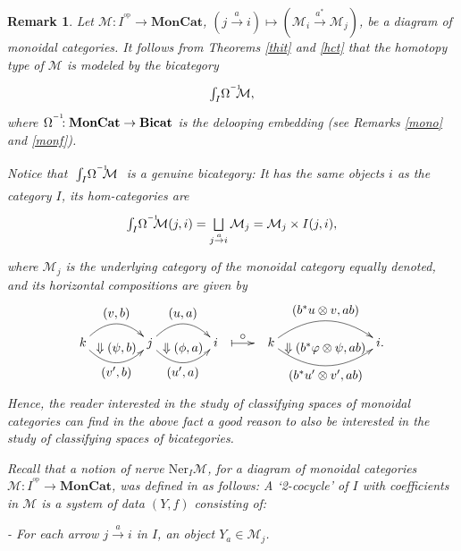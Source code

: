 \documentclass[]{amsart}
\newtheorem{remark}[theorem]{Remark}
\begin{document}
\begin{remark}{\em  Let ${\ensuremath{\mathcal{M}}}: I^{^\mathrm {op}} \to \mathbf{MonCat}$, $(j\overset{a}\to i)\mapsto   ({\ensuremath{\mathcal{M}}}_i\overset{a^*}\to {\ensuremath{\mathcal{M}}}_j)$, be a diagram of monoidal categories. It follows from Theorems \ref{thit} and \ref{hct} that the  homotopy type of ${\ensuremath{\mathcal{M}}}$ is modeled by the bicategory $$\xymatrix{\int_I\!\Omega^{^{-1}}\hspace{-5pt}{\ensuremath{\mathcal{M}}},}$$
where $\Omega^{^{-1}}\hspace{-5pt}:\mathbf{MonCat}\to {\ensuremath{\mathbf{Bicat}}}$ is the delooping embedding (see
Remarks \ref{mono} and \ref{monf}).

Notice that $\xymatrix{\int_I\!\Omega^{^{-1}}\hspace{-5pt}{\ensuremath{\mathcal{M}}}}$ is a genuine bicategory: It has the
same objects $i$ as the category $I$,  its hom-categories are
$$\xymatrix{\int_I\!\Omega^{^{-1}}\hspace{-5pt}{\ensuremath{\mathcal{M}}}(j,i)=\bigsqcup\limits_{j\overset{a}\to i}{\ensuremath{\mathcal{M}}}_j={\ensuremath{\mathcal{M}}}_j\times I(j,i),}$$
where ${\ensuremath{\mathcal{M}}}_j$ is the underlying category of the monoidal category equally denoted, and its
horizontal compositions are given by
$$\xymatrix@C=2pt{k  \ar@/^1.3pc/[rr]^{\textstyle (v,b)} \ar@/_1.3pc/[rr]_{\textstyle (v',b)} & {}_{\textstyle \Downarrow(\psi,b)} &j  \ar@/^1.3pc/[rr]^{\textstyle (u,a)} \ar@/_1.3pc/[rr]_{\textstyle (u',a)} & {}_{\textstyle \Downarrow(\phi,a)} &i&\ar@{|->}[rrr]^-{\textstyle \circ} && &&k \ar@/^1.5pc/[rr]^{\textstyle (b^*u\otimes v,ab)} \ar@/_1.5pc/[rr]_{\textstyle (b^*u'\otimes v',ab)}&{}_{\textstyle \Downarrow(b^*\varphi\otimes\psi,ab)}& i.  }  $$
Hence, the reader interested in the study of classifying spaces of monoidal categories can find in
the above fact a good reason to also be interested in the study of classifying spaces of
bicategories.

\vspace{0.2cm} Recall that a notion of nerve $ \mbox{Ner}_I{\ensuremath{\mathcal{M}}}$, for a diagram of monoidal
categories   ${\ensuremath{\mathcal{M}}}: I^{^\mathrm {op}} \to \mathbf{MonCat}$, was defined in \cite[(66)]{cegarra3}  as
follows:  A `2-cocycle' of $I$ with coefficients in ${\ensuremath{\mathcal{M}}}$ is  a system of data $(Y,f)$ consisting
of:

- For each arrow $j\overset{a}\to i$ in $I$, an object $Y_a\in {\ensuremath{\mathcal{M}}}_j$.

}
\end{remark}
\end{document}
